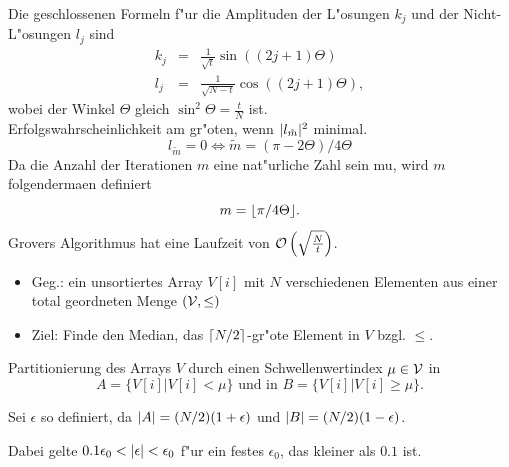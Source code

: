 %
% 
\begin{slide*}\sf
{}
   Die geschlossenen Formeln f"ur die Amplituden der L"osungen $k_j$ und
   der Nicht-L"osungen $l_j$ sind
   \begin{eqnarray*} 
      k_{j} & = & \frac{1}{\sqrt{t}}\sin\left(\left( 2j + 1\right)\Theta\right) \\ 
      l_{j} & = & \frac{1}{\sqrt{N-t}}\cos\left(\left( 2j + 1\right)\Theta\right),  
   \end{eqnarray*} 
   wobei der Winkel $\Theta$ gleich $\sin^2\Theta =\frac{t}{N}$ ist. \\

   Erfolgswahrscheinlichkeit am gr"o\3ten, wenn $\vert l_{\tilde m} \vert^2$ minimal.
   $$ l_{\tilde m} = 0 \iff \tilde m = \left( \pi - 2\Theta \right) / 4\Theta $$ 
   Da die Anzahl der Iterationen $m$ eine nat"urliche Zahl sein mu\3, wird $m$ folgenderma\3en definiert 
   $$ m = \lfloor \pi / 4\Theta \rfloor.$$ 
   Grovers Algorithmus hat eine Laufzeit von ${\cal O}\left(\sqrt{\frac{N}{t}}\right)$.
\end{slide*}


\begin{slide}\sf
{}
\begin{itemize}
  \item Geg.: ein unsortiertes Array $V[i]$ mit $N$ verschiedenen Elementen aus einer total geordneten Menge $({\cal V},\le )$
  \item Ziel: Finde den Median, das $\lceil N/2 \rceil$-gr"o\3te Element in $V$ bzgl. $\le$.
\end{itemize}
\end{slide}           


\begin{slide}\sf
{}
   Partitionierung des Arrays $V$ durch einen Schwellenwertindex $\mu\in{\cal V}$ in 
   $$ A=\{V[i] | V[i]<\mu\}  \mbox{ und in } B=\{V[i] | V[i]\ge\mu\}.$$ 

    Sei $\epsilon$ so definiert, da\3 $\vert A \vert=(N/2)(1+\epsilon)$ und 
    $\vert B \vert=(N/2)(1-\epsilon)$. 
 
    Dabei gelte $0.1\epsilon_0 < \vert \epsilon \vert < \epsilon_0$ f"ur ein festes $\epsilon_0$, das kleiner als $0.1$ ist.

\end{slide}

